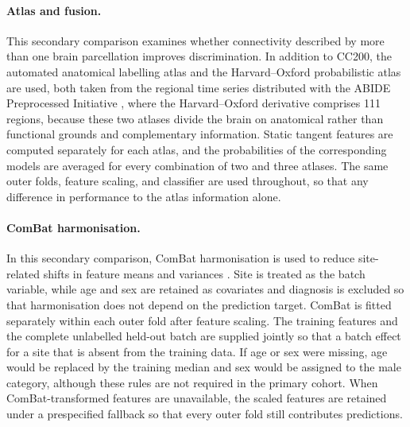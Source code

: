 \paragraph{\textbf{Atlas and fusion.}}
\label{par:atlas-fusion}
This secondary comparison examines whether connectivity described by more than one brain parcellation improves discrimination. In addition to CC200, the automated anatomical labelling atlas \citep{TzourioMazoyeretal2002} and the Harvard--Oxford probabilistic atlas are used, both taken from the regional time series distributed with the ABIDE Preprocessed Initiative \citep{Craddocketal2013}, where the Harvard--Oxford derivative comprises 111 regions, because these two atlases divide the brain on anatomical rather than functional grounds and  complementary information.  Static tangent features are computed separately for each atlas, and the probabilities of the corresponding models are averaged for every combination of two and three atlases. The same outer folds, feature scaling, and classifier are used throughout, so that any difference in performance  to the atlas information alone.

\paragraph{\textbf{ComBat harmonisation.}}
\label{par:combat-harmonisation}

In this secondary comparison, ComBat harmonisation is used to reduce site-related shifts in feature means and variances \citep{Johnsonetal2007,Fortinetal2018}. Site is treated as the batch variable, while age and sex are retained as covariates and diagnosis is excluded so that harmonisation does not depend on the prediction target. ComBat is fitted separately within each outer fold after feature scaling. The training features and the complete unlabelled held-out batch are supplied jointly so that a batch effect  for a site that is absent from the training data.  If age or sex were missing, age would be replaced by the training median and sex would be assigned to the male category, although these rules are not required in the primary cohort. When ComBat-transformed features are unavailable, the scaled features are retained under a prespecified fallback so that every outer fold still contributes predictions.


